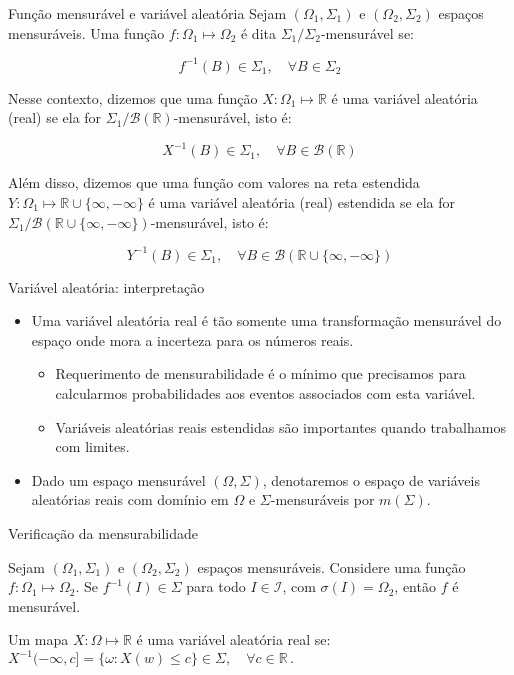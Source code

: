 \documentclass[11pt]{beamer}
\begin{document}
\begin{frame}{Função mensurável e variável aleatória}
Sejam $(\Omega_1, \Sigma_1)$ e $(\Omega_2, \Sigma_2)$ espaços mensuráveis.  Uma função $f: \Omega_1 \mapsto \Omega_2$ é dita $\Sigma_1 \slash \Sigma_2$-mensurável se: 

$$f^{-1}(B) \in \Sigma_1, \quad \forall B \in \Sigma_2$$

Nesse contexto, dizemos que uma função $X:  \Omega_1 \mapsto \mathbb{R}$ é uma {\color{red}variável aleatória (real)} se ela for $\Sigma_1/\mathcal{B}(\mathbb{R})$-mensurável, isto é:

$$X^{-1}(B) \in  \Sigma_1, \quad \forall B \in \mathcal{B}(\mathbb{R})$$

Além disso, dizemos que uma função com valores na reta estendida $Y:  \Omega_1 \mapsto \mathbb{R}\cup\{\infty,-\infty\}$ é uma {\color{red}variável aleatória (real) estendida} se ela for $\Sigma_1/\mathcal{B}(\mathbb{R} \cup\{\infty,-\infty\})$-mensurável, isto é:

$$Y^{-1}(B) \in  \Sigma_1, \quad \forall B \in \mathcal{B}(\mathbb{R}\cup\{\infty,-\infty\})$$
\end{frame}

\begin{frame}{Variável aleatória: interpretação}
	\begin{itemize}
		\item Uma variável aleatória real é tão somente uma transformação mensurável do espaço onde mora a incerteza para os números reais.
		\begin{itemize}
			\item Requerimento de mensurabilidade é o mínimo que precisamos para calcularmos probabilidades aos eventos associados com esta variável.
			\item Variáveis aleatórias reais estendidas são importantes quando trabalhamos com limites.
		\end{itemize}
		\item Dado um espaço mensurável $(\Omega, \Sigma)$, denotaremos o espaço de variáveis aleatórias reais com domínio em $\Omega$ e $\Sigma$-mensuráveis por $m(\Sigma)$.
	\end{itemize}
\end{frame}

\begin{frame}{Verificação da mensurabilidade}
\begin{lemma}
	Sejam $(\Omega_1, \Sigma_1)$ e $(\Omega_2, \Sigma_2)$ espaços mensuráveis. Considere uma função $f: \Omega_1 \mapsto \Omega_2$. Se $f^{-1}(I) \in \Sigma$ para todo $I \in \mathcal{I}$, com $\sigma(I) = \Omega_2$, então $f$ é mensurável.
\end{lemma}
\begin{corollary}
	Um mapa $X: \Omega \mapsto \mathbb{R}$ é uma variável aleatória real se:
	$X^{-1}(-\infty,c] = \{\omega : X(w) \leq c\} \in \Sigma, \quad \forall c \in \mathbb{R} \, .$
\end{corollary}
\end{frame}
\end{document}
